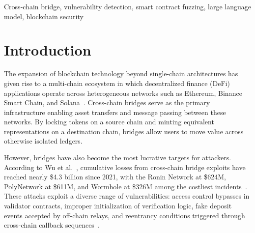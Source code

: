 \documentclass[journal]{IEEEtran}
\begin{document}
\begin{abstract}
run them on the same 12 benchmarks; under a stricter predicate-level matching criterion the re-implementations attain 12/12 (SmartShot), 10/12 (XScope), 9/12 (VulSEye), and 4/12 (SmartAxe), with the static analyzer's gap concentrated on runtime off-chain key-compromise cases. These results indicate that cross-chain detection hinges on the dual-chain modeling and LLM-derived invariants that BridgeSentry contributes, while the most exploit-faithful guidance among dynamic strategies remains an open comparison we quantify in Section~\ref{sec:experiments}.
\end{abstract}

\begin{IEEEkeywords}
Cross-chain bridge, vulnerability detection, smart contract fuzzing, large language model, blockchain security
\end{IEEEkeywords}

\section{Introduction}

The expansion of blockchain technology beyond single-chain architectures has given rise to a multi-chain ecosystem in which decentralized finance (DeFi) applications operate across heterogeneous networks such as Ethereum, Binance Smart Chain, and Solana~\cite{belchior2021survey, augusto2024sok}. Cross-chain bridges serve as the primary infrastructure enabling asset transfers and message passing between these networks. By locking tokens on a source chain and minting equivalent representations on a destination chain, bridges allow users to move value across otherwise isolated ledgers.

However, bridges have also become the most lucrative targets for attackers. According to Wu et al.~\cite{wu2025safeguarding}, cumulative losses from cross-chain bridge exploits have reached nearly \$4.3 billion since 2021, with the Ronin Network at \$624M, PolyNetwork at \$611M, and Wormhole at \$326M among the costliest incidents~\cite{augusto2024sok, lee2023sok}. These attacks exploit a diverse range of vulnerabilities: access control bypasses in validator contracts, improper initialization of verification logic, fake deposit events accepted by off-chain relays, and reentrancy conditions triggered through cross-chain callback sequences~\cite{liao2024smartaxe, duan2023attacks}.
\end{document}
